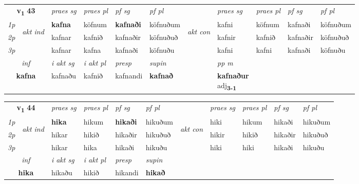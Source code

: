\noindent
\begin{tabular}{lllllllllll} \toprule
\multicolumn{2}{c}{\textbf{v{\textsubscript{1}}} \Large{\textbf{43}}}  &  \textit{praes sg}  & \textit{praes pl}  &\textit{ pf sg} & \textit{pf pl} &  &  \textit{praes sg}  & \textit{praes pl}  & \textit{pf sg} & \textit{pf pl } \\*
	\cmidrule{3-6} \cmidrule{8-11}
 {\textit{1p}} & \multirow{3}{*}{\begin{turn}{90}\textit{akt ind}\end{turn}} & \textbf{kafna} & köfnum & \textbf{kafnaði} & köfnuðum & \multirow{3}{*}{\begin{turn}{90}\textit{akt con}\end{turn}} &kafni & köfnum & kafnaði & köfnuðum\\*
 {\textit{2p}} &  &  kafnar  & kafnið & kafnaðir & köfnuðuð & & kafnir & kafnið & kafnaðir & köfnuðuð \\*
{\textit{3p}} &  & kafnar & kafna & kafnaði & köfnuðu & & kafni & kafni& kafnaði & köfnuðu \\*
\cmidrule{3-6} \cmidrule{8-11}

   \multicolumn{2}{c}{\textit{inf}}  & \textit{i akt sg} & \textit{i akt pl}   & \textit{presp} & \textit{supin}  && \textit{pp m} \\*
  \multicolumn{2}{c}{\textbf{kafna}} & kafnaðu  & kafnið   & kafnandi &  \textbf{kafnað}  && \specialcell{\textbf{kafnaður} \\ adj\textbf{\textsubscript{3-1}}} \\*
\end{tabular}

\noindent
\begin{tabular}{lllllllllll} \toprule
\multicolumn{2}{c}{\textbf{v{\textsubscript{1}}} \Large{\textbf{44}}}  &  \textit{praes sg}  & \textit{praes pl}  &\textit{ pf sg} & \textit{pf pl} &  &  \textit{praes sg}  & \textit{praes pl}  & \textit{pf sg} & \textit{pf pl } \\*
	\cmidrule{3-6} \cmidrule{8-11}
 {\textit{1p}} & \multirow{3}{*}{\begin{turn}{90}\textit{akt ind}\end{turn}} & \textbf{hika} & hikum & \textbf{hikaði} & hikuðum & \multirow{3}{*}{\begin{turn}{90}\textit{akt con}\end{turn}} &hiki & hikum & hikaði & hikuðum\\*
 {\textit{2p}} &  &  hikar  & hikið & hikaðir & hikuðuð & & hikir & hikið & hikaðir & hikuðuð \\*
{\textit{3p}} &  & hikar & hika & hikaði & hikuðu & & hiki & hiki& hikaði & hikuðu \\*
\cmidrule{3-6} \cmidrule{8-11}

   \multicolumn{2}{c}{\textit{inf}}  & \textit{i akt sg} & \textit{i akt pl}   & \textit{presp} & \textit{supin}   \\*
  \multicolumn{2}{c}{\textbf{hika}} & hikaðu  & hikið   & hikandi &  \textbf{hikað}   \\*
\end{tabular}


